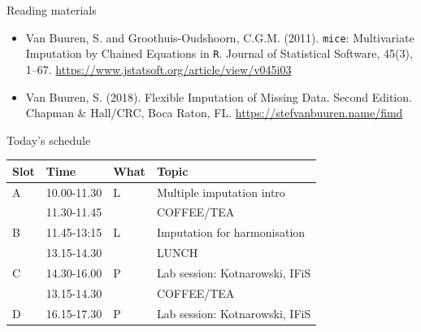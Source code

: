 \documentclass[ignorenonframetext,aspectratio=43]{beamer}
\providecommand{\tightlist}{%
  \setlength{\itemsep}{0pt}\setlength{\parskip}{0pt}}
\begin{document}
\begin{frame}[fragile]{Reading materials}
\protect\hypertarget{reading-materials}{}

\begin{itemize}
\tightlist
\item
  Van Buuren, S. and Groothuis-Oudshoorn, C.G.M. (2011). \texttt{mice}:
  Multivariate Imputation by Chained Equations in \texttt{R}. Journal of
  Statistical Software, 45(3), 1--67.
  \url{https://www.jstatsoft.org/article/view/v045i03}
\item
  Van Buuren, S. (2018). Flexible Imputation of Missing Data. Second
  Edition. Chapman \& Hall/CRC, Boca Raton, FL.
  \url{https://stefvanbuuren.name/fimd}
\end{itemize}

\end{frame}

\begin{frame}{}
\protect\hypertarget{section}{}


\end{frame}

\begin{frame}{Today's schedule}
\protect\hypertarget{todays-schedule}{}

\begin{longtable}[]{@{}llll@{}}
\toprule
Slot & Time & What & Topic\tabularnewline
\midrule
\endhead
A & 10.00-11.30 & L & Multiple imputation intro\tabularnewline
~ & 11.30-11.45 & ~ & COFFEE/TEA\tabularnewline
B & 11.45-13:15 & L & Imputation for harmonisation\tabularnewline
~ & 13.15-14.30 & ~ & LUNCH\tabularnewline
C & 14.30-16.00 & P & Lab session: Kotnarowski, IFiS\tabularnewline
~ & 13.15-14.30 & ~ & COFFEE/TEA\tabularnewline
D & 16.15-17.30 & P & Lab session: Kotnarowski, IFiS\tabularnewline
\bottomrule
\end{longtable}

\end{frame}
\end{document}
